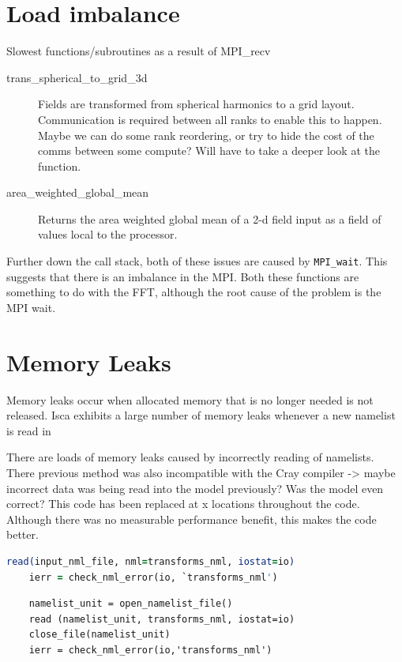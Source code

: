 \documentclass[a4paper,11pt]{report}
\begin{document}
\newpage
\section{Load imbalance}


Slowest functions/subroutines as a result of MPI\_recv
\begin{description}
	\item[trans\_spherical\_to\_grid\_3d] Fields are transformed from spherical harmonics to a grid layout. Communication is required between all ranks to enable this to happen. Maybe we can do some rank reordering, or try to hide the cost of the comms between some compute? Will have to take a deeper look at the function.
	\item[area\_weighted\_global\_mean] Returns the area weighted global mean of a 2-d field input as a field of values local to the processor.
\end{description}

Further down the call stack, both of these issues are caused by \texttt{MPI\_wait}. This suggests that there is an imbalance in the MPI. Both these functions are something to do with the FFT, although the root cause of the problem is the MPI wait.







\section{Memory Leaks}
Memory leaks occur when allocated memory that is no longer needed is not released. Isca exhibits a large number of memory leaks whenever a new namelist is read in
\par
There are loads of memory leaks caused by incorrectly reading of namelists. There previous method was also incompatible with the Cray compiler -> maybe incorrect data was being read into the model previously? Was the model even correct? This code has been replaced at x locations throughout the code. Although there was no measurable performance benefit, this makes the code better.

\begin{lstlisting}[language=Fortran]
    read(input_nml_file, nml=transforms_nml, iostat=io)
    ierr = check_nml_error(io, `transforms_nml')
\end{lstlisting}

\begin{lstlisting}
    namelist_unit = open_namelist_file()
    read (namelist_unit, transforms_nml, iostat=io)
    close_file(namelist_unit)
    ierr = check_nml_error(io,'transforms_nml')
\end{lstlisting}
\end{document}

